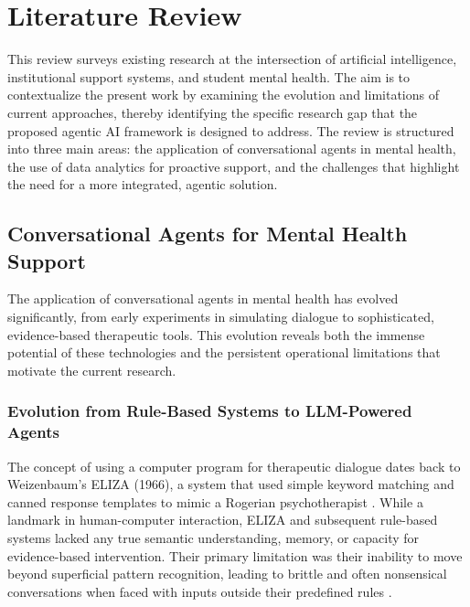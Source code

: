 
\section{Literature Review}
\label{sec:literature_review}

This review surveys existing research at the intersection of artificial intelligence, institutional support systems, and student mental health. The aim is to contextualize the present work by examining the evolution and limitations of current approaches, thereby identifying the specific research gap that the proposed agentic AI framework is designed to address. The review is structured into three main areas: the application of conversational agents in mental health, the use of data analytics for proactive support, and the challenges that highlight the need for a more integrated, agentic solution.

\subsection{Conversational Agents for Mental Health Support}

The application of conversational agents in mental health has evolved significantly, from early experiments in simulating dialogue to sophisticated, evidence-based therapeutic tools. This evolution reveals both the immense potential of these technologies and the persistent operational limitations that motivate the current research.

\subsubsection{Evolution from Rule-Based Systems to LLM-Powered Agents}
The concept of using a computer program for therapeutic dialogue dates back to Weizenbaum's ELIZA (1966), a system that used simple keyword matching and canned response templates to mimic a Rogerian psychotherapist \cite{FIND_CITATION_PLEASE}. While a landmark in human-computer interaction, ELIZA and subsequent rule-based systems lacked any true semantic understanding, memory, or capacity for evidence-based intervention. Their primary limitation was their inability to move beyond superficial pattern recognition, leading to brittle and often nonsensical conversations when faced with inputs outside their predefined rules \cite{FIND_CITATION_PLEASE}.

